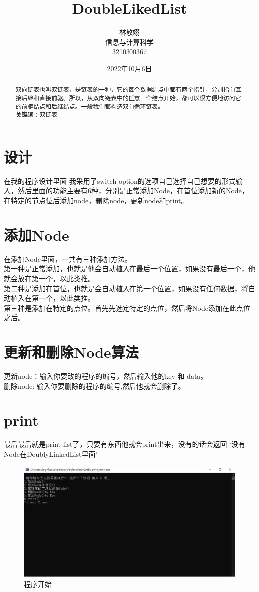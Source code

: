 \documentclass[UTF8]{ctexart}
\title{DoubleLikedList}
\author{林敬翊 \\ 信息与计算科学 \\ 3210300367}
\date{2022年10月6日}
\begin{document}
\maketitle

\begin{abstract}

双向链表也叫双链表，是链表的一种，它的每个数据结点中都有两个指针，分别指向直接后继和直接前驱。所以，从双向链表中的任意一个结点开始，都可以很方便地访问它的前驱结点和后继结点。一般我们都构造双向循环链表。\\

\textbf{关键词}：双链表

\end{abstract}

\section{设计}

在我的程序设计里面 我采用了switch option的选项自己选择自己想要的形式输入，然后里面的功能主要有6种，分别是正常添加Node，在首位添加新的Node，在特定的节点位后添加node，删除node，更新node和print。


\section{添加Node}
在添加Node里面，一共有三种添加方法。\\
第一种是正常添加，也就是他会自动植入在最后一个位置，如果没有最后一个，他就会放在第一个，以此类推。\\
第二种是添加在首位，也就是会自动植入在第一个位置，如果没有任何数据，将自动植入在第一个，以此类推。\\
第三种是添加在特定的点位。首先先选定特定的点位，然后将Node添加在此点位之后。

\section{更新和删除Node算法}
更新node：输入你要改的程序的编号，然后输入他的key 和 data。\\
删除node: 输入你要删除的程序的编号,然后他就会删除了。

\section{print}
最后最后就是print list了，只要有东西他就会print出来，没有的话会返回 `没有Node在DoublyLinkedList里面'

\begin{figure}[H]
  \includegraphics[width=\linewidth]{123.jpg}
  \centering
  \caption{程序开始}
\end{figure}
\end{document}
